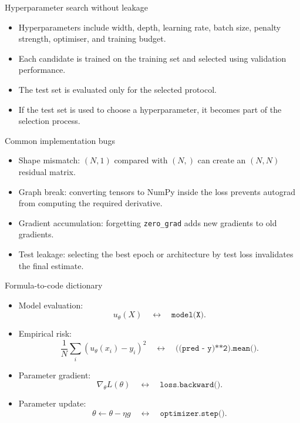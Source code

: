 \documentclass[aspectratio=43,11pt]{beamer}
\newcommand{\slideid}{L2}
\newenvironment{slideitems}{\small\begin{itemize}\setlength\itemsep{0.45em}}{\end{itemize}}
\begin{document}
\renewcommand{\slideid}{L2-S76}
\begin{frame}[t]{Hyperparameter search without leakage}
\begin{slideitems}
\item Hyperparameters include width, depth, learning rate, batch size, penalty strength, optimiser, and training budget.
\item Each candidate is trained on the training set and selected using validation performance.
\item The test set is evaluated only for the selected protocol.
\item If the test set is used to choose a hyperparameter, it becomes part of the selection process.
\end{slideitems}
\end{frame}

\renewcommand{\slideid}{L2-S77}
\begin{frame}[t]{Common implementation bugs}
\begin{slideitems}
\item Shape mismatch: $(N,1)$ compared with $(N,)$ can create an $(N,N)$ residual matrix.
\item Graph break: converting tensors to NumPy inside the loss prevents autograd from computing the required derivative.
\item Gradient accumulation: forgetting \texttt{zero\_grad} adds new gradients to old gradients.
\item Test leakage: selecting the best epoch or architecture by test loss invalidates the final estimate.
\end{slideitems}
\end{frame}

\renewcommand{\slideid}{L2-S78}
\begin{frame}[t]{Formula-to-code dictionary}
\begin{slideitems}
\item Model evaluation:
\[
u_\theta(X)\quad\longleftrightarrow\quad \texttt{model(X)}.
\]
\item Empirical risk:
\[
\frac1N\sum_i(u_\theta(x_i)-y_i)^2
\quad\longleftrightarrow\quad
\texttt{((pred - y)**2).mean()}.
\]
\item Parameter gradient:
\[
\nabla_\theta L(\theta)
\quad\longleftrightarrow\quad
\texttt{loss.backward()}.
\]
\item Parameter update:
\[
\theta\leftarrow\theta-\eta g
\quad\longleftrightarrow\quad
\texttt{optimizer.step()}.
\]
\end{slideitems}
\end{frame}
\end{document}

